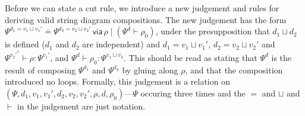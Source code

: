 \documentclass{amsart}
\let\types\vdash %
\def\cb{\mid} %
\def\flip#1{#1^*} %
\newcommand\combine{\sqcup}
\newcommand{\unif}[4]{#1\doteq #2\,\mathsf{ via }\,#3\cb #4}
\begin{document}
Before we can state a cut rule, we introduce a new judgement and rules
for deriving valid string diagram compositions. The new judgement has
the form $\unif{\Psi^{d_1=v_1\combine v_1'}}{\Psi^{d_2 = v_2\combine
    v_2'}}{\rho}{(\Psi^d \vdash \rho_0)}$, under the presupposition that
$d_1 \combine d_2$ is defined ($d_1$ and $d_2$ are independent) and $d_1
= v_1 \combine v_1'$, $d_2 = v_2 \combine v_2'$ and $\Psi^{\flip{v_2'}}
\types \rho:\Psi^{v_1'}$, and $\Psi^d \types \rho_0:\Psi^{v_1\combine
  v_2}$. This should be read as stating that $\Psi^d$ is the result of
composing $\Psi^{d_1}$ and $\Psi^{d_2}$ by gluing along $\rho$, and that
the composition introduced no loops.  Formally, this judgement is a
relation on $(\Psi,d_1,v_1,v_1',d_2,v_2,v_2',\rho,d,\rho_0)$---$\Psi$
occuring three times and the $=$ and $\combine$ and $\vdash$ in the
judgement are just notation.
\end{document}
